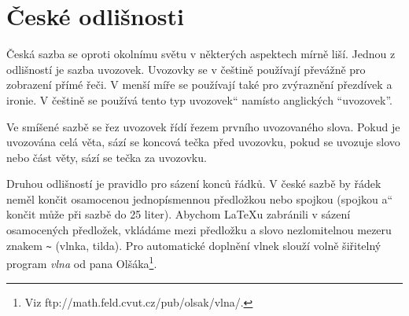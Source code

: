 \documentclass[a4paper,11pt,twocolumn]{article}
\providecommand{\uv}[1]{\quotedblbase #1\textquotedblleft}
\begin{document}
\section{České odlišnosti}
Česká sazba se oproti okolnímu světu v některých aspektech mírně liší. Jednou z odlišností je sazba uvozovek. Uvozovky se v češtině používají převážně pro zobrazení přímé řeči. V menší míře se používají také pro zvýraznění přezdívek a ironie. V češtině se používá tento \uv{typ uvozovek} namísto anglických \textquotedblleft{uvozovek}''.
\par
Ve smíšené sazbě se řez uvozovek řídí řezem prvního uvozovaného slova. Pokud je uvozována celá věta, sází se koncová tečka před uvozovku, pokud se uvozuje slovo nebo část věty, sází se tečka za uvozovku.
\par
Druhou odlišností je pravidlo pro sázení konců řádků. V české sazbě by řádek neměl končit osamocenou jednopísmennou předložkou nebo spojkou (spojkou \uv{a} končit může při sazbě do 25 liter). Abychom {\LaTeX}u zabránili v sázení osamocených předložek, vkládáme mezi předložku a slovo nezlomitelnou mezeru znakem \verb|~| (vlnka, tilda). Pro automatické doplnění vlnek slouží volně šiřitelný program \emph{vlna} od pana Olšáka\footnote{Viz ftp://math.feld.cvut.cz/pub/olsak/vlna/.}.
\end{document}

